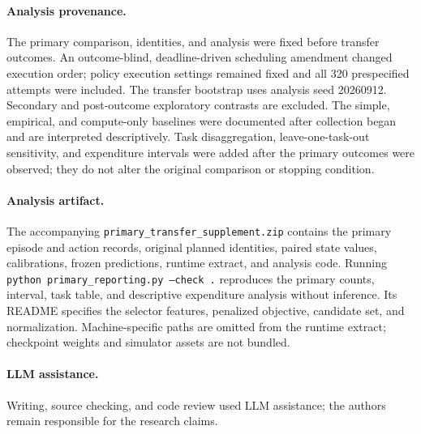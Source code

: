 \documentclass{article}
\begin{document}
\FloatBarrier
\paragraph{Analysis provenance.}
\label{app:analysis-provenance}

The primary comparison, identities, and analysis were fixed before transfer
outcomes. An outcome-blind, deadline-driven scheduling amendment changed execution
order; policy execution settings remained fixed and all 320 prespecified attempts
were included. The transfer bootstrap uses analysis seed 20260912.
Secondary and post-outcome exploratory contrasts are excluded. The simple,
empirical, and compute-only baselines were documented after collection began
and are interpreted descriptively. Task disaggregation, leave-one-task-out
sensitivity, and expenditure intervals were added after the primary outcomes
were observed; they do not alter the original comparison or stopping condition.

\paragraph{Analysis artifact.}
The accompanying \texttt{primary\_transfer\_supplement.zip} contains the primary
episode and action records, original planned identities, paired state values,
calibrations, frozen predictions, runtime extract, and analysis code.
Running \texttt{python primary\_reporting.py --check .} reproduces the primary
counts, interval, task table, and descriptive expenditure analysis without
inference. Its README specifies the selector features, penalized objective,
candidate set, and normalization. Machine-specific paths are omitted from the
runtime extract; checkpoint weights and simulator assets are not bundled.

\paragraph{LLM assistance.}
Writing, source checking, and code review used LLM assistance; the authors
remain responsible for the research claims.
\end{document}
